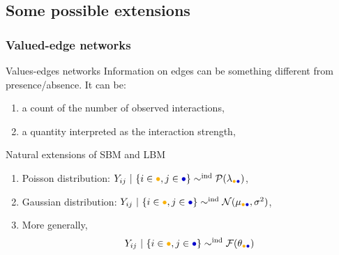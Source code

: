 \documentclass[compress,10pt]{beamer}
\begin{document}
\subsection{Some possible extensions}
\begin{frame} \frametitle{Valued-edge networks}

\begin{block}{Values-edges networks}
 Information on edges can be something different from presence/absence.
 It can be:
 \begin{enumerate}
  \item a count of the number of observed interactions,
  \item a quantity interpreted as the interaction strength,
  \end{enumerate}

 \end{block}

 \bigskip
 
 


\begin{block}{ Natural extensions of SBM and LBM}
 \begin{enumerate}
  \item Poisson distribution: $Y_{ij} \ | \ \{i\in\textcolor{yellow!40!orange}{\bullet},j\in\textcolor{blue!80!black}{\bullet}\}
\sim^{\text{ind}} \mathcal{P}(\lambda_{\textcolor{yellow!40!orange}{\bullet}\textcolor{blue!80!black}{\bullet}})$,
 \item Gaussian distribution: $Y_{ij} \ | \ \{i\in\textcolor{yellow!40!orange}{\bullet},j\in\textcolor{blue!80!black}{\bullet}\}
\sim^{\text{ind}} \mathcal{N}(\mu_{\textcolor{yellow!40!orange}{\bullet}\textcolor{blue!80!black}{\bullet}},\sigma^2)$,
\textcolor{mygreen}{\cite{mariadassou2010uncovering}}
\item More generally, 
  $$Y_{ij} \ | \ \{i\in\textcolor{yellow!40!orange}{\bullet},j\in\textcolor{blue!80!black}{\bullet}\}
\sim^{\text{ind}} \mathcal{F}(\theta_{\textcolor{yellow!40!orange}{\bullet}\textcolor{blue!80!black}{\bullet}})$$
 \end{enumerate}
 \end{block}
 \bigskip

\end{frame}
\end{document}
